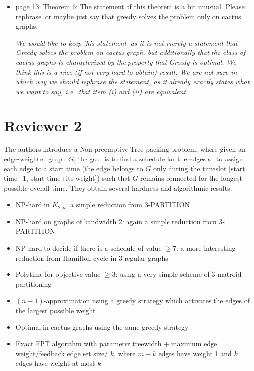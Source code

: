 \documentclass[11pt,a4paper]{article}
\begin{document}
\begin{itemize}
\item page 13: Theorem 6: The statement of this theorem is a bit unusual. Please rephrase, or maybe just say that greedy solves the problem only on cactus graphs.

\textit{We would like to keep this statement, as it is not merely a statement that Greedy solves the problem on cactus graph, but additionally that the class of cactus graphs is characterized by the property that Greedy is optimal. We think this is a nice (if not very hard to obtain) result. We are not sure in which way we should rephrase the statement, as it already exactly states what we want to say, i.e.\ that item (i) and (ii) are equivalent.}

\end{itemize}


\section*{Reviewer 2}

The authors introduce a Non-preemptive Tree packing problem, where given an edge-weighted graph $G$, the goal is to find a schedule for the edges or to assign each edge to a start time (the edge belongs to $G$ only during the timeslot [start time+1, start time+its weight]) such that $G$ remains connected for the longest possible overall time. They obtain several hardness and algorithmic results:

\begin{itemize}
\item NP-hard in $K_{2,n}$: a simple reduction from 3-PARTITION
\item NP-hard on graphs of bandwidth 2: again a simple reduction from 3-PARTITION
\item NP-hard to decide if there is a schedule of value $\geq 7$: a more interesting reduction from Hamilton cycle in 3-regular graphs

\item Polytime for objective value $\geq 3$: using a very simple scheme of 3-matroid partitioning    
\item $(n-1)$-approximation using a greedy strategy which activates the edges of the largest possible weight
\item Optimal in cactus graphs using the same greedy strategy
\item Exact FPT algorithm with parameter treewidth + maximum edge weight/feedback edge set size/ $k$, where $m-k$ edges have weight 1 and $k$ edges have weight at most $k$
\end{itemize}
\end{document}
